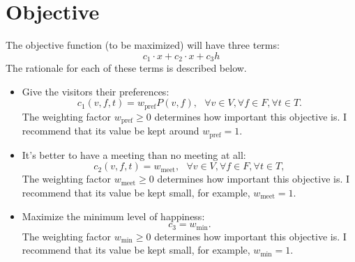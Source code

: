 \documentclass[12pt]{article}
\theoremstyle{definition}
\newtheorem{definition set}{Definition Set}%
\newtheorem{problem statement}{Problem Statement} %
\theoremstyle{remark}
\theoremstyle{remark}
\begin{document}
\section{Objective}
The objective function (to be maximized) will have three terms:
\begin{equation}
c_1 \cdot x + c_2 \cdot x + c_3 h
\end{equation}
The rationale for each of these terms is described below.
\begin{itemize}
\item
Give the visitors their preferences:
\begin{equation}
c_1(v,f,t) = w_\text{pref} P(v,f), \ \ \ \forall v \in V, \forall f \in F, \forall t \in T.
\end{equation}
The weighting factor $w_{\text{pref}} \geq 0$ determines how important this objective is.
I recommend that its value be kept around $w_{\text{pref}} = 1$.

\item
It\rq{}s better to have a meeting than no meeting at all:
\begin{equation}
c_2(v,f,t) = w_{\text{meet}}, \ \ \ \forall v \in V, \forall f \in F, \forall t \in T,
\end{equation}
The weighting factor $w_{\text{meet}} \geq 0$ determines how important this objective is.
I recommend that its value be kept small, for example, $w_{\text{meet}} = 1$.

\item
Maximize the minimum level of happiness:
\begin{equation}
c_3 = w_{\text{min}}.
\end{equation}
The weighting factor $w_{\text{min}} \geq 0$ determines how important this objective is.
I recommend that its value be kept small, for example, $w_{\text{min}} = 1$.
\end{itemize}
\end{document}
